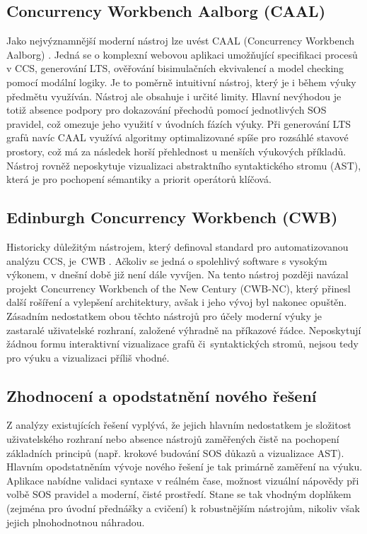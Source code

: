 \subsection{Concurrency Workbench Aalborg (CAAL)}
Jako nejvýznamnější moderní nástroj lze uvést CAAL (Concurrency Workbench Aalborg) \cite{caal}. 
Jedná se o komplexní webovou aplikaci umožňující specifikaci procesů v CCS, generování LTS, ověřování bisimulačních ekvivalencí a model checking pomocí modální logiky.
Je to poměrně intuitivní nástroj, který je i během výuky předmětu využíván. Nástroj ale obsahuje i určité limity. 
Hlavní nevýhodou je totiž absence podpory pro dokazování přechodů pomocí jednotlivých SOS pravidel, což omezuje jeho využití v úvodních fázích výuky.
Při generování LTS grafů navíc CAAL využívá algoritmy optimalizované spíše pro rozsáhlé stavové prostory, což má za následek horší přehlednost u menších výukových příkladů. 
Nástroj rovněž neposkytuje vizualizaci abstraktního syntaktického stromu (AST), která je pro pochopení sémantiky a priorit operátorů klíčová.

\subsection{Edinburgh Concurrency Workbench (CWB)}
Historicky důležitým nástrojem, který definoval standard pro automatizovanou analýzu CCS, je~CWB \cite{CWB}. 
Ačkoliv se jedná o spolehlivý software s vysokým výkonem, v dnešní době již není dále vyvíjen.
Na tento nástroj později navázal projekt Concurrency Workbench of the New Century (CWB-NC), který přinesl další rošíření a vylepšení architektury, avšak i jeho vývoj byl nakonec opuštěn.
Zásadním nedostatkem obou těchto nástrojů pro účely moderní výuky je zastaralé uživatelské rozhraní, založené výhradně na příkazové řádce. 
Neposkytují žádnou formu interaktivní vizualizace grafů či~syntaktických stromů, nejsou tedy pro výuku a vizualizaci příliš vhodné.

\subsection{Zhodnocení a opodstatnění nového řešení}
Z analýzy existujících řešení vyplývá, že jejich hlavním nedostatkem je složitost uživatelského rozhraní nebo absence nástrojů zaměřených čistě na pochopení základních principů (např. krokové budování SOS důkazů a vizualizace AST).
Hlavním opodstatněním vývoje nového řešení je tak primárně zaměření na výuku. 
Aplikace nabídne validaci syntaxe v reálném čase, možnost vizuální nápovědy při volbě SOS pravidel a moderní, čisté prostředí. 
Stane se tak vhodným doplňkem (zejména pro úvodní přednášky a cvičení) k robustnějším nástrojům, nikoliv však jejich plnohodnotnou náhradou.

